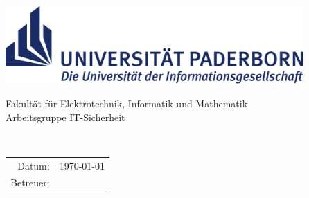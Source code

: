 
\begin{titlepage}
	\centering
	\begin{minipage}{14cm}		
		\hspace*{1.9cm}
		\includegraphics[height=3cm]{figures/upb_logo}\\
		\hspace*{4cm}
		\begin{minipage}{9.5cm}
			\vspace*{5pt}
			\textsf{\noindent
				Fakultät für Elektrotechnik, Informatik und Mathematik\\
				Arbeitsgruppe IT-Sicherheit
			}
		\end{minipage}		
	\end{minipage}\\[50pt]
	{\Large\bfseries \Type\par}
	\vspace{1.5cm}
	{\huge\sffamily\bfseries{\Title}\par}
	\vspace{2cm}
	{\Large \Author\par}
	\vfill
	\begin{tabular}{r l}
		Datum:    & \today \\
		Betreuer: & \Supervisor\\
	\end{tabular}
	\vfill
\end{titlepage}